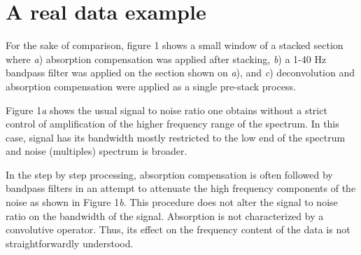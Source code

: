 \documentclass[twoside,letterpaper,twocolumn]{article}
\begin{document}
\section{A real data example}

For the sake of comparison, figure 1 shows a small window of a stacked section where \textit{a}) absorption
compensation was applied after stacking, \textit{b}) a 1-40 Hz bandpass filter was applied on the section 
shown on \textit{a}), and \textit{c}) deconvolution and absorption compensation were applied as a single 
pre-stack process. 

Figure 1\textit{a} shows the usual signal to noise ratio one obtains
without a strict control of amplification of the higher frequency range of the spectrum. In this case, 
signal has its bandwidth mostly restricted to the low end of the spectrum and noise (multiples) spectrum
is broader. 

In the step by step processing, absorption compensation is often followed by bandpass filters in an 
attempt to attenuate the high frequency components of the noise as shown in Figure 1\textit{b}. 
This procedure does not alter the signal to noise ratio on the bandwidth of the signal. Absorption 
is not characterized by a convolutive operator. Thus, its effect on the frequency content of the data is not 
straightforwardly understood.
\end{document}

